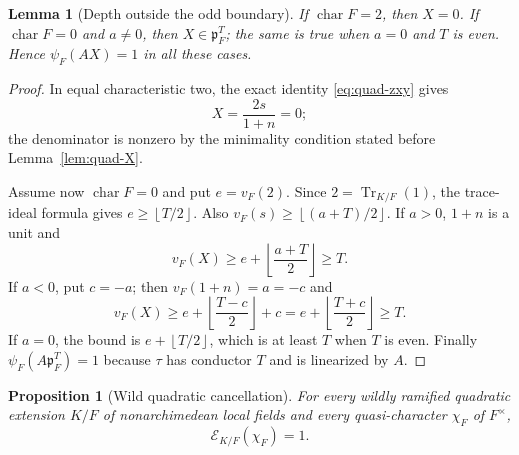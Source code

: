 \documentclass[11pt]{amsart}
\newtheorem{proposition}[theorem]{Proposition}
\newtheorem{lemma}[theorem]{Lemma}
\theoremstyle{definition}
\theoremstyle{remark}
\newcommand{\p}{\mathfrak p}
\newcommand{\Tr}{\operatorname{Tr}}
\newcommand{\Err}{\mathcal E}
\newcommand{\floor}[1]{\left\lfloor #1\right\rfloor}
\begin{document}
\begin{lemma}[Depth outside the odd boundary]
\label{lem:quadratic-depth}
If $\operatorname{char}F=2$, then $X=0$.  If
$\operatorname{char}F=0$ and $a\ne0$, then $X\in\p_F^T$; the same is
true when $a=0$ and $T$ is even.  Hence $\psi_F(AX)=1$ in all these
cases.
\end{lemma}

\begin{proof}
In equal characteristic two, the exact identity
\eqref{eq:quad-zxy} gives
\[
 X=\frac{2s}{1+n}=0;
\]
the denominator is nonzero by the minimality condition stated before
Lemma~\ref{lem:quad-X}.

Assume now $\operatorname{char}F=0$ and put $e=v_F(2)$.  Since
$2=\Tr_{K/F}(1)$, the trace-ideal formula gives
$e\ge\floor{T/2}$.  Also
$v_F(s)\ge\floor{(a+T)/2}$.  If $a>0$, $1+n$ is a unit and
\[
 v_F(X)\ge e+\floor{\frac{a+T}{2}}\ge T.
\]
If $a<0$, put $c=-a$; then $v_F(1+n)=a=-c$ and
\[
 v_F(X)\ge e+\floor{\frac{T-c}{2}}+c
          =e+\floor{\frac{T+c}{2}}\ge T.
\]
If $a=0$, the bound is $e+\floor{T/2}$, which is at least $T$ when
$T$ is even.  Finally $\psi_F(A\p_F^T)=1$ because $\tau$ has conductor
$T$ and is linearized by $A$.
\end{proof}

\begin{proposition}[Wild quadratic cancellation]
\label{prop:wild-quadratic-cancellation}
For every wildly ramified quadratic extension $K/F$ of nonarchimedean
local fields and every quasi-character $\chi_F$ of $F^\times$,
\[
 \Err_{K/F}(\chi_F)=1.
\]
\end{proposition}
\end{document}
